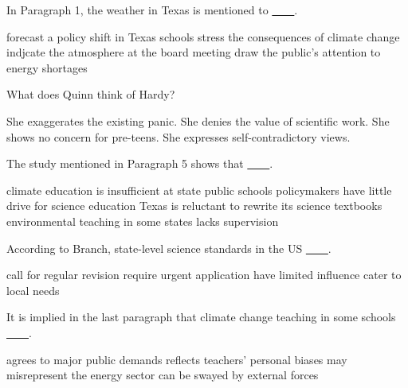 \item In Paragraph 1, the weather in Texas is mentioned to \uline{~~~~}.
\begin{tasks}
	\task forecast a policy shift in Texas schools
	\task stress the consequences of climate change
	\task indjcate the atmosphere at the board meeting
	\task draw the public's attention to energy shortages
\end{tasks}
\item What does Quinn think of Hardy?
\begin{tasks}
	\task She exaggerates the existing panic.
	\task She denies the value of scientific work.
	\task She shows no concern for pre-teens.
	\task She expresses self-contradictory views.
\end{tasks}
\item The study mentioned in Paragraph 5 shows that \uline{~~~~}.
\begin{tasks}
	\task climate education is insufficient at state public schools
	\task policymakers have little drive for science education
	\task Texas is reluctant to rewrite its science textbooks
	\task environmental teaching in some states lacks supervision
\end{tasks}
\item According to Branch, state-level science standards in the US \uline{~~~~}.
\begin{tasks}
	\task call for regular revision
	\task require urgent application
	\task have limited influence
	\task cater to local needs
\end{tasks}
\item It is implied in the last paragraph that climate change teaching in some schools \uline{~~~~}.
\begin{tasks}
	\task agrees to major public demands
	\task reflects teachers' personal biases
	\task may misrepresent the energy sector
	\task can be swayed by external forces
\end{tasks}